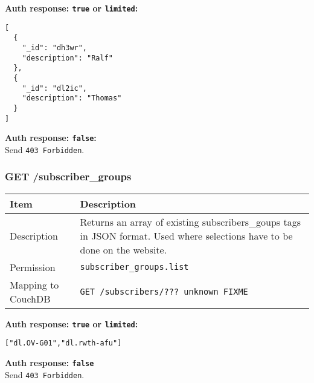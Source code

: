 \textbf{Auth response: \texttt{true} or \texttt{limited}:}\\
\begin{lstlisting}
[
  {
    "_id": "dh3wr",
    "description": "Ralf"
  },
  {
    "_id": "dl2ic",
    "description": "Thomas"
  }
]
\end{lstlisting}

\textbf{Auth response: \texttt{false}:}\\
Send \verb|403 Forbidden|.

\subsubsection{GET /subscriber\_groups}
\label{protocoldef:microservicesapi:database:getsubscriber/_groups}
\begin{table}[htbp]
  \begin{tabular}{|l|p{12cm}|} \hline
    Item               & Description  \\ \hline \hline
    Description        & Returns an array of existing subscribers\_goups tags in JSON format. Used where selections have to be done on the website. \\ \hline
    Permission         & \verb|subscriber_groups.list| \\ \hline
    Mapping to CouchDB & \verb|GET /subscribers/??? unknown FIXME|\\ \hline
  \end{tabular}
\end{table}

\textbf{Auth response: \texttt{true} or \texttt{limited}:}
\begin{lstlisting}
["dl.OV-G01","dl.rwth-afu"]
\end{lstlisting}

\textbf{Auth response: \texttt{false}}\\
Send \verb|403 Forbidden|.


\newpage
